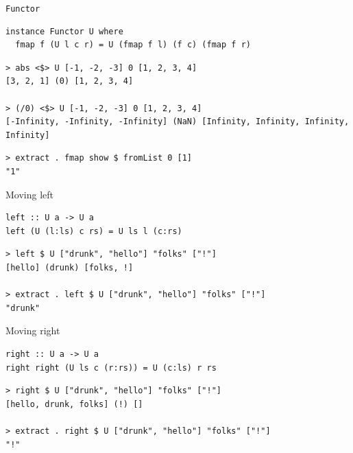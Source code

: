 \documentclass[presentation,aspectratio=169,smaller]{beamer}
\begin{document}
\begin{frame}[label={sec:orgc5ca4a4},fragile]{\texttt{Functor}}
 \begin{verbatim}
instance Functor U where
  fmap f (U l c r) = U (fmap f l) (f c) (fmap f r)
\end{verbatim}

\pause

\begin{verbatim}
> abs <$> U [-1, -2, -3] 0 [1, 2, 3, 4]
[3, 2, 1] (0) [1, 2, 3, 4]

> (/0) <$> U [-1, -2, -3] 0 [1, 2, 3, 4]
[-Infinity, -Infinity, -Infinity] (NaN) [Infinity, Infinity, Infinity, Infinity]
\end{verbatim}

\pause

\begin{verbatim}
> extract . fmap show $ fromList 0 [1]
"1"
\end{verbatim}
\end{frame}

\begin{frame}[label={sec:org2e94b67},fragile]{Moving left}
 \begin{verbatim}
left :: U a -> U a
left (U (l:ls) c rs) = U ls l (c:rs)
\end{verbatim}

\pause

\begin{verbatim}
> left $ U ["drunk", "hello"] "folks" ["!"]
[hello] (drunk) [folks, !]

> extract . left $ U ["drunk", "hello"] "folks" ["!"]
"drunk"
\end{verbatim}
\end{frame}

\begin{frame}[label={sec:orgea8e361},fragile]{Moving right}
 \begin{verbatim}
right :: U a -> U a
right right (U ls c (r:rs)) = U (c:ls) r rs
\end{verbatim}

\pause

\begin{verbatim}
> right $ U ["drunk", "hello"] "folks" ["!"]
[hello, drunk, folks] (!) []

> extract . right $ U ["drunk", "hello"] "folks" ["!"]
"!"
\end{verbatim}
\end{frame}
\end{document}
